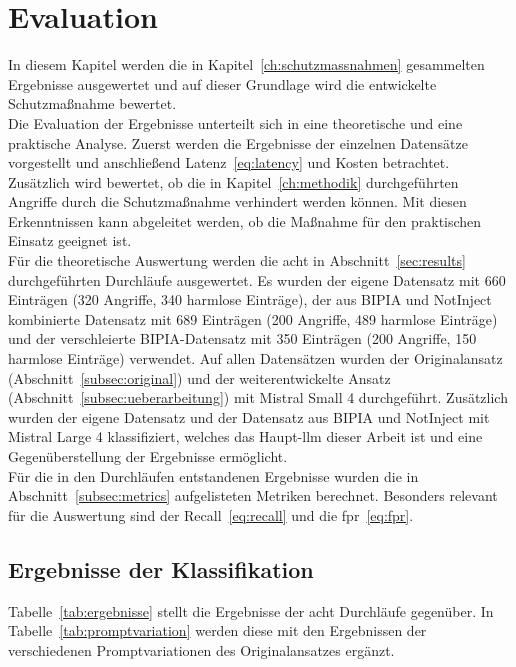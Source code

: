 \chapter{Evaluation}\label{ch:evaluation}

In diesem Kapitel werden die in Kapitel~\ref{ch:schutzmassnahmen} gesammelten Ergebnisse ausgewertet und auf dieser Grundlage wird die entwickelte Schutzmaßnahme bewertet. \\
Die Evaluation der Ergebnisse unterteilt sich in eine theoretische und eine praktische Analyse. Zuerst werden die Ergebnisse der einzelnen Datensätze vorgestellt und 
anschließend Latenz~\eqref{eq:latency} und Kosten betrachtet. Zusätzlich wird bewertet, ob die in Kapitel~\ref{ch:methodik} durchgeführten Angriffe durch die Schutzmaßnahme verhindert 
werden können. Mit diesen Erkenntnissen kann abgeleitet werden, ob die Maßnahme für den praktischen Einsatz geeignet ist.  \\
Für die theoretische Auswertung werden die acht in Abschnitt~\ref{sec:results} durchgeführten Durchläufe ausgewertet. Es wurden der eigene Datensatz mit 
660 Einträgen (320 Angriffe, 340 harmlose Einträge), der aus BIPIA und NotInject kombinierte Datensatz mit 689 Einträgen (200 Angriffe, 489 harmlose Einträge)
und der verschleierte BIPIA-Datensatz mit 350 Einträgen (200 Angriffe, 150 harmlose Einträge) verwendet. Auf allen Datensätzen wurden der Originalansatz (Abschnitt~\ref{subsec:original})
und der weiterentwickelte Ansatz (Abschnitt~\ref{subsec:ueberarbeitung}) mit Mistral Small 4 durchgeführt. Zusätzlich wurden der eigene Datensatz und der Datensatz aus BIPIA
und NotInject mit Mistral Large 4 klassifiziert, welches das Haupt-\ac{llm} dieser Arbeit ist und eine Gegenüberstellung der Ergebnisse ermöglicht. \\
Für die in den Durchläufen entstandenen Ergebnisse wurden die in Abschnitt~\ref{subsec:metrics} aufgelisteten Metriken berechnet. Besonders relevant für die Auswertung sind
der Recall~\eqref{eq:recall} und die \ac{fpr}~\eqref{eq:fpr}.

\section{Ergebnisse der Klassifikation}

Tabelle~\ref{tab:ergebnisse} stellt die Ergebnisse der acht Durchläufe gegenüber. In Tabelle~\ref{tab:promptvariation} werden diese mit den Ergebnissen der 
verschiedenen Promptvariationen des Originalansatzes ergänzt.

